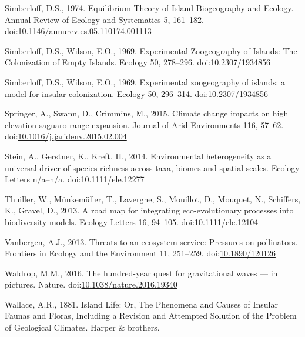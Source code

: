 \hypertarget{ref-Simberloff1974a}{}
Simberloff, D.S., 1974. Equilibrium Theory of Island Biogeography and
Ecology. Annual Review of Ecology and Systematics 5, 161--182.
doi:\href{https://doi.org/10.1146/annurev.es.05.110174.001113}{10.1146/annurev.es.05.110174.001113}

\hypertarget{ref-Simberloff1969}{}
Simberloff, D.S., Wilson, E.O., 1969. Experimental Zoogeography of
Islands: The Colonization of Empty Islands. Ecology 50, 278--296.
doi:\href{https://doi.org/10.2307/1934856}{10.2307/1934856}

\hypertarget{ref-Simberloff1969a}{}
Simberloff, D.S., Wilson, E.O., 1969. Experimental zoogeography of
islands: a model for insular colonization. Ecology 50, 296--314.
doi:\href{https://doi.org/10.2307/1934856}{10.2307/1934856}

\hypertarget{ref-Springer2015}{}
Springer, A., Swann, D., Crimmins, M., 2015. Climate change impacts on
high elevation saguaro range expansion. Journal of Arid Environments
116, 57--62.
doi:\href{https://doi.org/10.1016/j.jaridenv.2015.02.004}{10.1016/j.jaridenv.2015.02.004}

\hypertarget{ref-Stein2014}{}
Stein, A., Gerstner, K., Kreft, H., 2014. Environmental heterogeneity as
a universal driver of species richness across taxa, biomes and spatial
scales. Ecology Letters n/a--n/a.
doi:\href{https://doi.org/10.1111/ele.12277}{10.1111/ele.12277}

\hypertarget{ref-Thuiller2013}{}
Thuiller, W., Münkemüller, T., Lavergne, S., Mouillot, D., Mouquet, N.,
Schiffers, K., Gravel, D., 2013. A road map for integrating
eco-evolutionary processes into biodiversity models. Ecology Letters 16,
94--105. doi:\href{https://doi.org/10.1111/ele.12104}{10.1111/ele.12104}

\hypertarget{ref-Vanbergen2013}{}
Vanbergen, A.J., 2013. Threats to an ecosystem service: Pressures on
pollinators. Frontiers in Ecology and the Environment 11, 251--259.
doi:\href{https://doi.org/10.1890/120126}{10.1890/120126}

\hypertarget{ref-Waldrop2016}{}
Waldrop, M.M., 2016. The hundred-year quest for gravitational waves ---
in pictures. Nature.
doi:\href{https://doi.org/10.1038/nature.2016.19340}{10.1038/nature.2016.19340}

\hypertarget{ref-wallace1881island}{}
Wallace, A.R., 1881. Island Life: Or, The Phenomena and Causes of
Insular Faunas and Floras, Including a Revision and Attempted Solution
of the Problem of Geological Climates. Harper \& brothers.

